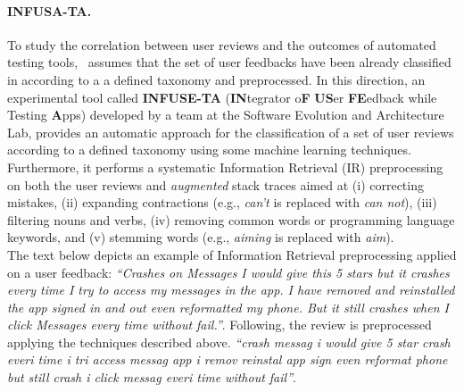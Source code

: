 \paragraph{INFUSA-TA.}
\label{par: infusa}
To study the correlation between user reviews and the outcomes of automated testing tools, \toolname\ assumes that the set of user feedbacks have been already classified in according to a a defined taxonomy and preprocessed.
In this direction, an experimental tool called  \textbf{INFUSE-TA} (\textbf{IN}tegrator o\textbf{F} \textbf{US}er \textbf{FE}edback while Testing \textbf{A}pps) developed by a team at the Software Evolution and Architecture Lab, provides an automatic approach for the classification of a set of user reviews according to a defined taxonomy using some machine learning techniques. 
Furthermore, it performs a systematic Information Retrieval (IR) preprocessing \cite{BaezaYates:1999} on both the user reviews and \textit{augmented} stack traces aimed at (i) correcting mistakes, (ii) expanding contractions (e.g., \textit{can’t} is replaced with \textit{can not}), (iii) filtering nouns and verbs, (iv) removing common words or programming language keywords, and (v) stemming words (e.g., \textit{aiming} is replaced with \textit{aim}). \\
The text below depicts an example of Information Retrieval preprocessing applied on a user feedback: 
\smallbreak
\emph{\small``Crashes on Messages I would give this 5 stars but it crashes every time I try to access my messages in the app. I have removed and reinstalled the app  signed in and out  even reformatted my phone. But it still crashes when I click Messages  every time without fail.''}. 
\smallbreak
Following, the review is preprocessed applying the techniques described above.  
\smallbreak
\emph{\small``crash messag i would give 5 star crash everi time i tri access messag app i remov reinstal app  sign  even reformat phone but still crash i click messag  everi time without fail''}. 
\smallbreak


